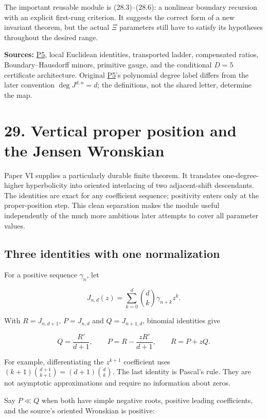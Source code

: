 \documentclass[
  10pt,
  a4paper,
  10pt,
  oneside,
  openany]{book}
\begin{document}
The important reusable module is (28.3)--(28.6): a nonlinear boundary
recursion with an explicit first-rung criterion. It suggests the correct
form of a new invariant theorem, but the actual \(\Xi\) parameters still
have to satisfy its hypotheses throughout the desired range.

\textbf{Sources:} \hyperref[source-p5]{P5}, local Euclidean identities,
transported ladder, compensated ratios, Boundary--Hausdorff minors,
primitive gauge, and the conditional \(D=5\) certificate architecture.
Original \hyperref[source-p5]{P5}'s polynomial degree label differs from
the later convention \(\deg J^{d,n}=d\); the definitions, not the shared
letter, determine the map.

\section{29. Vertical proper position and the Jensen
Wronskian}\label{ch-vertical}

Paper VI supplies a particularly durable finite theorem. It translates
one-degree-higher hyperbolicity into oriented interlacing of two
adjacent-shift descendants. The identities are exact for any coefficient
sequence; positivity enters only at the proper-position step. This clean
separation makes the module useful independently of the much more
ambitious later attempts to cover all parameter values.

\subsection{Three identities with one
normalization}\label{three-identities-with-one-normalization}

For a positive sequence \(\gamma_n\), let

\[
 J_{n,d}(z)=\sum_{k=0}^d\binom dk\gamma_{n+k}z^k.
\]

With \(R=J_{n,d+1}\), \(P=J_{n,d}\) and \(Q=J_{n+1,d}\), binomial
identities give

\[
 Q=\frac{R'}{d+1},\qquad
 P=R-\frac{zR'}{d+1},\qquad
 R=P+zQ.
 \tag{29.1}\label{eq:29.1}
\]

For example, differentiating the \(z^{k+1}\) coefficient uses
\((k+1)\binom{d+1}{k+1}=(d+1)\binom dk\). The last identity is Pascal's
rule. They are not asymptotic approximations and require no information
about zeros.

Say \(P\ll Q\) when both have simple negative roots, positive leading
coefficients, and the source's oriented Wronskian is positive:
\end{document}
